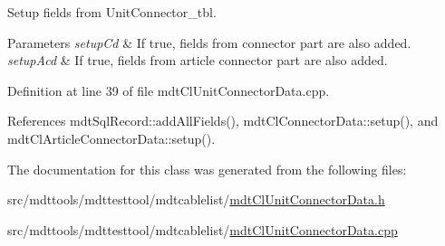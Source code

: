 Setup fields from Unit\-Connector\-\_\-tbl. 


\begin{DoxyParams}{Parameters}
{\em setup\-Cd} & If true, fields from connector part are also added. \\
\hline
{\em setup\-Acd} & If true, fields from article connector part are also added. \\
\hline
\end{DoxyParams}


Definition at line 39 of file mdt\-Cl\-Unit\-Connector\-Data.\-cpp.



References mdt\-Sql\-Record\-::add\-All\-Fields(), mdt\-Cl\-Connector\-Data\-::setup(), and mdt\-Cl\-Article\-Connector\-Data\-::setup().



The documentation for this class was generated from the following files\-:\begin{DoxyCompactItemize}
\item 
src/mdttools/mdttesttool/mdtcablelist/\hyperlink{mdt_cl_unit_connector_data_8h}{mdt\-Cl\-Unit\-Connector\-Data.\-h}\item 
src/mdttools/mdttesttool/mdtcablelist/\hyperlink{mdt_cl_unit_connector_data_8cpp}{mdt\-Cl\-Unit\-Connector\-Data.\-cpp}\end{DoxyCompactItemize}
